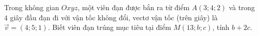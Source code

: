 \begin{ex}%
	Trong không gian $O x y z$, một viên đạn được bắn ra từ điểm $A(3 ; 4 ; 2)$ và trong $4$ giây đầu đạn đi với vận tốc không đổi, vectơ vận tốc (trên giây) là $\overrightarrow{v}=(4 ; 5 ; 1)$. Biết viên đạn trúng mục tiêu tại điểm $M(13 ; b ; c)$, tính $b+2 c$.\\
\end{ex}


